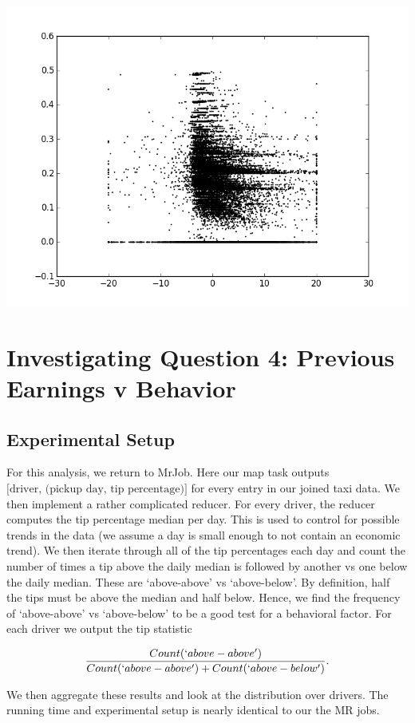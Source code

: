 \documentclass[twoside]{article}
\begin{document}
\begin{multicols}{2}
\includegraphics[scale=.35]{figure_2.png}

\section{Investigating Question 4: Previous Earnings v Behavior}
\subsection{Experimental Setup}
For this analysis, we return to MrJob. Here our map task outputs $\text{[driver, (pickup day, tip percentage)]}$
for every entry in our joined taxi data. We then implement a rather complicated reducer.  For every driver, the reducer computes the tip percentage median per day. This is used to control for possible trends in the data (we assume a day is small enough to not contain an economic trend). We then iterate through all of the tip percentages each day and count the number of times a tip above the daily median is followed by another vs one below the daily median. These are `above-above' vs `above-below'. By definition, half the tips must be above the median and half below. Hence, we find the frequency of `above-above' vs `above-below' to be a good test for a behavioral factor. For each driver we output the tip statistic

$$\frac{Count(`above-above')}{Count(`above-above') + Count(`above-below')}.$$

We then aggregate these results and look at the distribution over drivers. The running time and experimental setup is nearly identical to our the MR jobs. 

\end{multicols}
\end{document}
